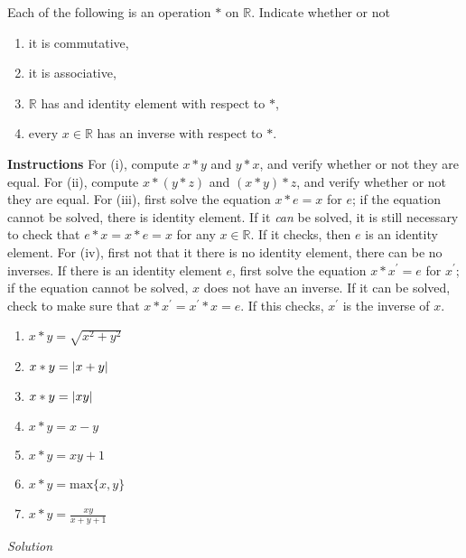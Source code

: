 \documentclass[12pt]{article}
\DeclarePairedDelimiter{\abs}{\lvert}{\rvert}
\begin{document}
\begin{flushleft}
Each of the following is an operation $*$ on $\mathbb{R}$. Indicate whether or not

\renewcommand{\theenumi}{(\roman{enumi})}
\begin{enumerate}
  \item it is commutative,
  \item it is associative,
  \item $\mathbb{R}$ has and identity element with respect to $*$,
  \item every $x \in \mathbb{R}$ has an inverse with respect to $*$.
\end{enumerate}

\textbf{Instructions} For (i), compute $x * y$ and $y * x$, and verify whether or not they are equal. For (ii), compute $x * (y * z)$ and $(x * y) * z$, and verify whether or not they are equal. For (iii), first solve the equation $x * e = x$ for $e$; if the equation cannot be solved, there is identity element. If it \textit{can} be solved, it is still necessary to check that $e * x = x * e = x$ for any $x \in \mathbb{R}$. If it checks, then $e$ is an identity element. For (iv), first not that it there is no identity element, there can be no inverses. If there is an identity element $e$, first solve the equation $x * x^{'} = e$ for $x^{'}$; if the equation cannot be solved, $x$ does not have an inverse. If it can be solved, check to make sure that $x * x^{'} = x^{'} * x = e$. If this checks, $x^{'}$ is the inverse of $x$.

\renewcommand{\theenumi}{\arabic{enumi}}
\begin{enumerate}

\item $x * y = \sqrt{x^2 + y^2}$
\item $x * y = \abs{ x + y }$
\item $x * y = \abs{ xy }$
\item $x * y = x - y $
\item $x * y = xy + 1 $
\item $x * y = \text{max}\{x,y\}$
\item $x * y = \frac{xy}{x + y + 1}$
\end{enumerate}

\textit{Solution}

\begin{enumerate}


\end{enumerate}
\end{flushleft}
\end{document}
